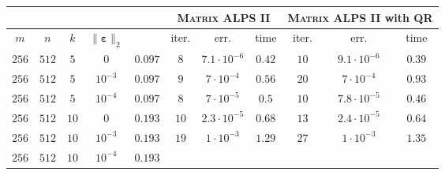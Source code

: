 \documentclass[twocolumn]{svjour3}
\newcommand{\vectornormbig}[1]{\big\|#1\big\|}
\newcommand{\noise}{\boldsymbol{\varepsilon}}
\newcommand{\rank}{k}
\begin{document}
\begin{table*}
\begin{center}
\begin{tabular}{|c|c|c|c|c|c|c|c|c|c|c|c|c|c}
\multicolumn{4}{c|}{} & & \multicolumn{3}{|c|}{\textsc{Matrix ALPS II}} & \multicolumn{6}{|c}{\textsc{Matrix ALPS II} with QR}  \\
\hline \hline
\multicolumn{1}{c}{$m$}  & \multicolumn{1}{c}{$n$} & \multicolumn{1}{c}{$\rank$} & \multicolumn{1}{c|}{$\vectornormbig{\noise}_2$} & & 
\multicolumn{1}{|c}{\rm{iter.}} & \multicolumn{1}{c}{\rm{err.}} & \multicolumn{1}{c|}{\rm{time}} &
\multicolumn{2}{|c}{\rm{iter.}} & \multicolumn{2}{c}{\rm{err.}} & \multicolumn{2}{c}{\rm{time}}  \\
\hline\hline
\multicolumn{1}{c}{$256$} & \multicolumn{1}{c}{$512$} & \multicolumn{1}{c}{$5$}  & \multicolumn{1}{c|}{$0$} & $ 0.097 $ & 
\multicolumn{1}{|c}{$8$} & \multicolumn{1}{c}{$7.1 \cdot 10^{-6}$} & \multicolumn{1}{c|}{$0.42$} &
\multicolumn{2}{|c}{$10$} & \multicolumn{2}{c}{$9.1 \cdot 10^{-6}$} & \multicolumn{2}{c}{$\mathbf{0.39}$} \\
\hline
\multicolumn{1}{c}{$256$} & \multicolumn{1}{c}{$512$} & \multicolumn{1}{c}{$5$}  & \multicolumn{1}{c|}{$10^{-3}$} & $ 0.097 $ & 
\multicolumn{1}{|c}{$9$} & \multicolumn{1}{c}{$7 \cdot 10^{-4}$} & \multicolumn{1}{c|}{$\mathbf{0.56}$} &
\multicolumn{2}{|c}{$20$} & \multicolumn{2}{c}{$7 \cdot 10^{-4}$} & \multicolumn{2}{c}{$0.93$} \\
\hline
\multicolumn{1}{c}{$256$} & \multicolumn{1}{c}{$512$} & \multicolumn{1}{c}{$5$}  & \multicolumn{1}{c|}{$10^{-4}$} & $ 0.097 $ & 
\multicolumn{1}{|c}{$8$} & \multicolumn{1}{c}{$7 \cdot 10^{-5}$} & \multicolumn{1}{c|}{$0.5$} &
\multicolumn{2}{|c}{$10$} & \multicolumn{2}{c}{$7.8 \cdot 10^{-5}$} & \multicolumn{2}{c}{$\mathbf{0.46}$} \\
\hline
\multicolumn{1}{c}{$256$} & \multicolumn{1}{c}{$512$} & \multicolumn{1}{c}{$10$}  & \multicolumn{1}{c|}{$0$} & $ 0.193 $ & 
\multicolumn{1}{|c}{$10$} & \multicolumn{1}{c}{$2.3 \cdot 10^{-5}$} & \multicolumn{1}{c|}{$0.68$} &
\multicolumn{2}{|c}{$13$} & \multicolumn{2}{c}{$2.4 \cdot 10^{-5}$} & \multicolumn{2}{c}{$\mathbf{0.64}$} \\
\hline
\multicolumn{1}{c}{$256$} & \multicolumn{1}{c}{$512$} & \multicolumn{1}{c}{$10$}  & \multicolumn{1}{c|}{$10^{-3}$} & $ 0.193 $ & 
\multicolumn{1}{|c}{$19$} & \multicolumn{1}{c}{$1 \cdot 10^{-3}$} & \multicolumn{1}{c|}{$\mathbf{1.29}$} &
\multicolumn{2}{|c}{$27$} & \multicolumn{2}{c}{$1 \cdot 10^{-3}$} & \multicolumn{2}{c}{$1.35$} \\
\hline
\multicolumn{1}{c}{$256$} & \multicolumn{1}{c}{$512$} & \multicolumn{1}{c}{$10$}  & \multicolumn{1}{c|}{$10^{-4}$} & $ 0.193 $ & 

\end{tabular}
\end{center}
\end{table*}
\end{document}
